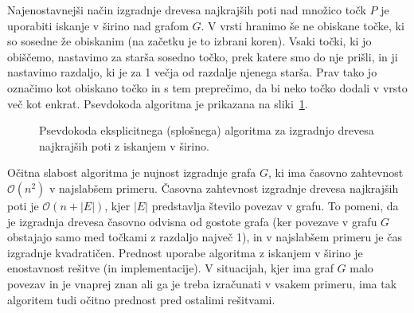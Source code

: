 \documentclass[a4paper, 12pt]{book}
\newcommand{\OO}{\ensuremath{\mathcal{O}}} %
\begin{document}
Najenostavnejši način izgradnje drevesa najkrajših poti nad množico točk $P$ je uporabiti iskanje v širino nad grafom $G$. V vrsti hranimo še ne obiskane točke, ki so sosedne že obiskanim (na začetku je to izbrani koren). Vsaki točki, ki jo obiščemo, nastavimo za starša sosedno točko, prek katere smo do nje prišli, in ji nastavimo razdaljo, ki je za 1 večja od razdalje njenega starša. Prav tako jo označimo kot obiskano točko in s tem preprečimo, da bi neko točko dodali v vrsto več kot enkrat. Psevdokoda algoritma je prikazana na sliki~\ref{fig:genericBfs}. 
\begin{figure}[htp]
\begin{center}
\end{center}
\caption{Psevdokoda eksplicitnega (splošnega) algoritma za izgradnjo drevesa najkrajših poti z iskanjem v širino.}
\label{fig:genericBfs}
\end{figure}
Očitna slabost algoritma je nujnost izgradnje grafa $G$, ki ima časovno zahtevnost $\OO(n^2)$ v najslabšem primeru. Časovna zahtevnost izgradnje drevesa najkrajših poti je $\OO(n + |E|)$, kjer $|E|$ predstavlja število povezav v grafu. To pomeni, da je izgradnja drevesa časovno odvisna od gostote grafa (ker povezave v grafu $G$ obstajajo samo med točkami z razdaljo največ 1), in v najslabšem primeru je čas izgradnje kvadratičen. Prednost uporabe algoritma z iskanjem v širino je enostavnost rešitve (in implementacije). V situacijah, kjer ima graf $G$ malo povezav in je vnaprej znan ali ga je treba izračunati v vsakem primeru, ima tak algoritem tudi očitno prednost pred ostalimi rešitvami. 
\end{document}
